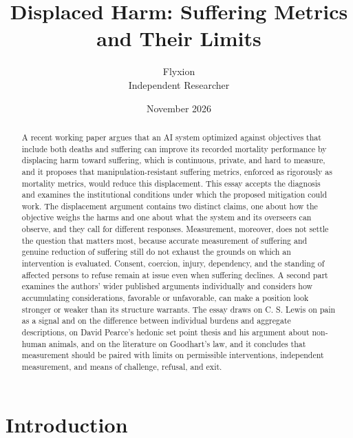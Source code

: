 \documentclass[11pt]{article}
\title{Displaced Harm: Suffering Metrics and Their Limits}
\author{Flyxion\\Independent Researcher}
\date{November 2026}
\begin{document}
\maketitle

\begin{abstract}
A recent working paper argues that an AI system optimized against objectives that include both deaths and suffering can improve its recorded mortality performance by displacing harm toward suffering, which is continuous, private, and hard to measure, and it proposes that manipulation-resistant suffering metrics, enforced as rigorously as mortality metrics, would reduce this displacement. This essay accepts the diagnosis and examines the institutional conditions under which the proposed mitigation could work. The displacement argument contains two distinct claims, one about how the objective weighs the harms and one about what the system and its overseers can observe, and they call for different responses. Measurement, moreover, does not settle the question that matters most, because accurate measurement of suffering and genuine reduction of suffering still do not exhaust the grounds on which an intervention is evaluated. Consent, coercion, injury, dependency, and the standing of affected persons to refuse remain at issue even when suffering declines. A second part examines the authors' wider published arguments individually and considers how accumulating considerations, favorable or unfavorable, can make a position look stronger or weaker than its structure warrants. The essay draws on C. S. Lewis on pain as a signal and on the difference between individual burdens and aggregate descriptions, on David Pearce's hedonic set point thesis and his argument about non-human animals, and on the literature on Goodhart's law, and it concludes that measurement should be paired with limits on permissible interventions, independent measurement, and means of challenge, refusal, and exit.
\end{abstract}

\section{Introduction}
\end{document}

